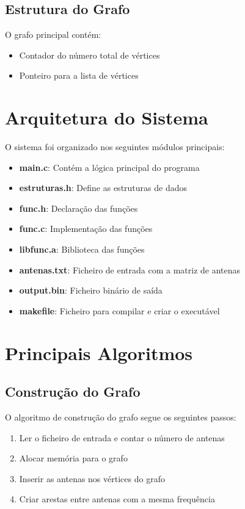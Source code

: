 \documentclass[a4paper, 12pt]{report}
\begin{document}
\subsection{Estrutura do Grafo}
O grafo principal contém:
\begin{itemize}
\item Contador do número total de vértices
\item Ponteiro para a lista de vértices
\end{itemize}

\newpage

\section{Arquitetura do Sistema}
O sistema foi organizado nos seguintes módulos principais:
\begin{itemize}
\item \textbf{main.c}: Contém a lógica principal do programa
\item \textbf{estruturas.h}: Define as estruturas de dados
\item \textbf{func.h}: Declaração das funções
\item \textbf{func.c}: Implementação das funções
\item \textbf{libfunc.a}: Biblioteca das funções
\item \textbf{antenas.txt}: Ficheiro de entrada com a matriz de antenas
\item \textbf{output.bin}: Ficheiro binário de saída
\item \textbf{makefile}: Ficheiro para compilar e criar o executável
\end{itemize}

\newpage

\section{Principais Algoritmos}
\subsection{Construção do Grafo}
O algoritmo de construção do grafo segue os seguintes passos:
\begin{enumerate}
\item Ler o ficheiro de entrada e contar o número de antenas
\item Alocar memória para o grafo
\item Inserir as antenas nos vértices do grafo
\item Criar arestas entre antenas com a mesma frequência
\end{enumerate}
\end{document}
